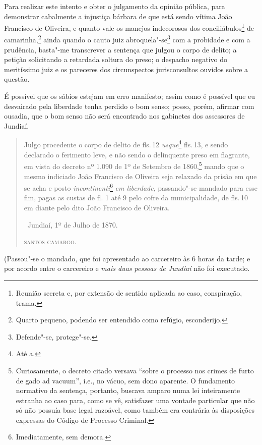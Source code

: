 Para realizar este intento e obter o julgamento da opinião pública, para
demonstrar cabalmente a injustiça bárbara de que está sendo vítima João
Francisco de Oliveira, e quanto vale os manejos indecorosos dos
conciliábulos\footnote{Reunião secreta e, por extensão de sentido
  aplicada ao caso, conspiração, trama.} de camarinha,\footnote{Quarto
  pequeno, podendo ser entendido como refúgio, esconderijo.} ainda
quando o cauto juiz abroquela"-se\footnote{Defende"-se, protege"-se.} com
a probidade e com a prudência, basta"-me transcrever a sentença que
julgou o corpo de delito; a petição solicitando a retardada soltura do
preso; o despacho negativo do meritíssimo juiz e os pareceres dos
circunspectos jurisconsultos ouvidos sobre a questão.

É possível que os sábios estejam em erro manifesto; assim como é
possível que eu desvairado pela liberdade tenha perdido o bom senso;
posso, porém, afirmar com ousadia, que o bom senso não será encontrado
nos gabinetes dos assessores de Jundiaí.

\asterisc

\begin{quote}
Julgo procedente o corpo de delito de fls.\,12 \emph{usque}\footnote{Até a.} fls.\,13, e sendo declarado o ferimento leve, e não sendo o
delinquente preso em flagrante, em vista do decreto nº 1.090 de 1º de
Setembro de 1860,\footnote{Curiosamente, o decreto citado versava
  ``sobre o processo nos crimes de furto de gado ad vacuum'', i.e., no
  vácuo, sem dono aparente. O fundamento normativo da sentença,
  portanto, buscava amparo numa lei inteiramente estranha ao caso para,
  como se vê, satisfazer uma vontade particular que não só não possuía
  base legal razoável, como também era contrária às disposições expressas
  do Código de Processo Criminal.} mando que o mesmo indiciado João
Francisco de Oliveira seja relaxado da prisão em que se acha e posto
\emph{incontinenti}\footnote{Imediatamente, sem demora.} \emph{em
liberdade}, passando"-se mandado para esse fim, pagas as custas de fl. 1
até 9 pelo cofre da municipalidade, de fls.\,10 em diante pelo dito João
Francisco de Oliveira.

\medskip

\hfill\ Jundiaí, 1º de Julho de 1870.\smallskip

\hfill\textsc{santos camargo.}
\end{quote}

\noindent(Passou"-se o mandado, que foi apresentado ao carcereiro às 6 horas da
tarde; e por acordo entre o carcereiro e \emph{mais duas pessoas de
Jundiaí} não foi executado.

